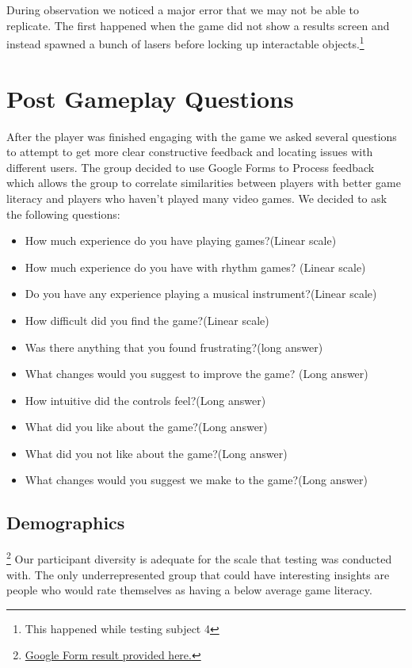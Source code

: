 \documentclass[twoside,twocolumn]{article}
\begin{document}
During observation we noticed a major error that we may not be able to replicate.
The first happened when the game did not show a results screen and instead spawned a bunch of lasers
before locking up interactable objects.\footnote{This happened while testing subject 4}




\section{Post Gameplay Questions}
After the player was finished engaging with the game we asked several questions to
attempt to get more clear constructive feedback and locating issues with different
 users. The group decided to use Google Forms to Process feedback which allows the group
 to correlate similarities between players with better game literacy and players who haven't played many video games. We decided to ask the following questions:

\begin{itemize}
\item How much experience do you have playing games?(Linear scale)
\item How much experience do you have with rhythm games? (Linear scale)
\item Do you have any experience playing a musical instrument?(Linear scale)
\item How difficult did you find the game?(Linear scale)
\item Was there anything that you found frustrating?(long answer)
\item What changes would you suggest to improve the game? (Long answer)
\item How intuitive did the controls feel?(Long answer)
\item What did you like about the game?(Long answer)
\item What did you not like about the game?(Long answer)
\item What changes would you suggest we make to the game?(Long answer)
\end{itemize}
\subsection{Demographics}\footnote{\hyperlink{https://docs.google.com/spreadsheets/d/1ANOVLghsAPeU3L3zo1TeeCbxSlEFg69GmU0cMx_n9CA/edit?usp=sharing}{Google Form result provided here.}}
Our participant diversity is adequate for the scale that testing was conducted with.
The only underrepresented group  that could have interesting insights are people who would
rate themselves as having a below average game literacy.
\end{document}
